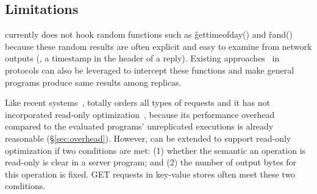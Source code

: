 \subsection{\xxx Limitations}\label{sec:limits}


\xxx currently does not hook random functions such as \v{gettimeofday()} and 
\v{rand()} because these random results are often explicit and easy to examine 
from network outputs (\eg, a timestamp in the header of a reply). Existing 
approaches~\cite{eve:osdi12,paxos:practical} in \paxos protocols can also be 
leveraged to intercept these functions and make general programs produce same 
results among replicas.




Like recent systems~\cite{dare:hpdc15,crane:sosp15}, \xxx totally orders all 
types of requests and it has not incorporated 
read-only optimization~\cite{eve:osdi12}, because its performance overhead 
compared to the evaluated programs' unreplicated executions is already 
reasonable (\S\ref{sec:overhead}). However, \xxx can be extended to 
support read-only optimization if two conditions are met: (1) whether the 
semantic an operation is read-only is clear in a server program; and (2) the 
number of output bytes for this operation is fixed. GET requests in key-value 
stores often meet these two conditions.

